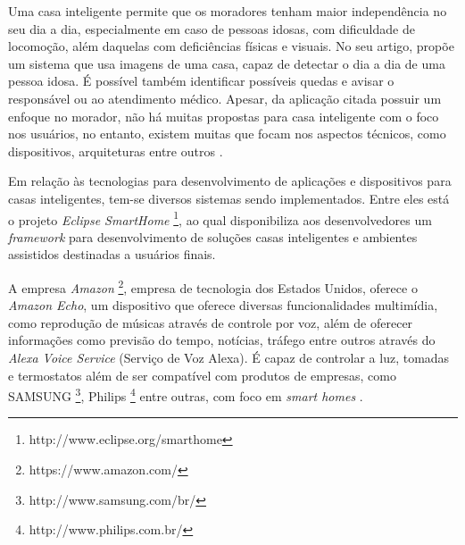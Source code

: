 




Uma casa inteligente permite que os moradores tenham maior independência no seu dia a dia, especialmente em caso de pessoas idosas, com dificuldade de locomoção, além daquelas com deficiências físicas e visuais.
No seu artigo,  propõe um sistema que usa imagens de uma casa, capaz de detectar o dia a dia de uma pessoa idosa. É possível também identificar possíveis quedas e avisar o responsável ou ao atendimento médico. Apesar, da aplicação citada possuir um enfoque no morador, não há muitas propostas para casa inteligente com o foco nos usuários, no entanto, existem muitas que focam nos aspectos técnicos, como dispositivos, arquiteturas entre outros \cite{Wilson2015}.


Em relação às tecnologias para desenvolvimento de aplicações e dispositivos para casas inteligentes, tem-se diversos sistemas sendo implementados. Entre eles está o projeto \textit{Eclipse SmartHome} \textsuperscript{\texttrademark}
\footnote{http://www.eclipse.org/smarthome}, ao qual disponibiliza aos desenvolvedores um \textit{framework} para desenvolvimento de soluções casas inteligentes e ambientes assistidos destinadas a usuários finais. 
    

A empresa \textit{Amazon} \textsuperscript{\textregistered}
\footnote{https://www.amazon.com/}, empresa de tecnologia dos Estados Unidos, oferece o \textit{Amazon Echo}, um dispositivo que oferece diversas funcionalidades multimídia, como reprodução de músicas através de controle por voz, além de oferecer informações como previsão do tempo, notícias, tráfego entre outros através do \textit{Alexa Voice Service} (Serviço de Voz Alexa). É capaz de controlar a luz, tomadas e termostatos além de ser compatível com produtos de empresas, como SAMSUNG\textsuperscript{\textregistered}
\footnote{http://www.samsung.com/br/}, Philips{\textregistered}
\footnote{http://www.philips.com.br/} entre outras, com foco em \textit{smart homes} \cite{amazon2017}.

